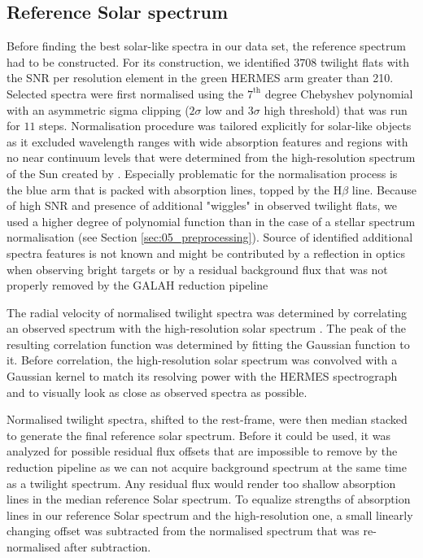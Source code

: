 \subsection{Reference Solar spectrum}
\label{sec:05_reference}
Before finding the best solar-like spectra in our data set, the reference spectrum had to be constructed. For its construction, we identified $3708$ twilight flats with the SNR per resolution element in the green HERMES arm greater than 210. Selected spectra were first normalised using the $7^\text{th}$ degree Chebyshev polynomial with an asymmetric sigma clipping ($2\sigma$ low and $3\sigma$ high threshold) that was run for $11$ steps. Normalisation procedure was tailored explicitly for solar-like objects as it excluded wavelength ranges with wide absorption features and regions with no near continuum levels that were determined from the high-resolution spectrum of the Sun created by \citet{2005MSAIS...8..189K}. Especially problematic for the normalisation process is the blue arm that is packed with absorption lines, topped by the H$\beta$ line. Because of high SNR and presence of additional "wiggles" in observed twilight flats, we used a higher degree of polynomial function than in the case of a stellar spectrum normalisation (see Section \ref{sec:05_preprocessing}). Source of identified additional spectra features is not known and might be contributed by a reflection in optics when observing bright targets or by a residual background flux that was not properly removed by the GALAH reduction pipeline \cite{2017MNRAS.464.1259K}

The radial velocity of normalised twilight spectra was determined by correlating an observed spectrum with the high-resolution solar spectrum \cite{2005MSAIS...8..189K}. The peak of the resulting correlation function was determined by fitting the Gaussian function to it. Before correlation, the high-resolution solar spectrum was convolved with a Gaussian kernel to match its resolving power with the HERMES spectrograph and to visually look as close as observed spectra as possible. 

Normalised twilight spectra, shifted to the rest-frame, were then median stacked to generate the final reference solar spectrum. Before it could be used, it was analyzed for possible residual flux offsets that are impossible to remove by the reduction pipeline as we can not acquire background spectrum at the same time as a twilight spectrum. Any residual flux would render too shallow absorption lines in the median reference Solar spectrum. To equalize strengths of absorption lines in our reference Solar spectrum and the high-resolution one, a small linearly changing offset was subtracted from the normalised spectrum that was re-normalised after subtraction. 

